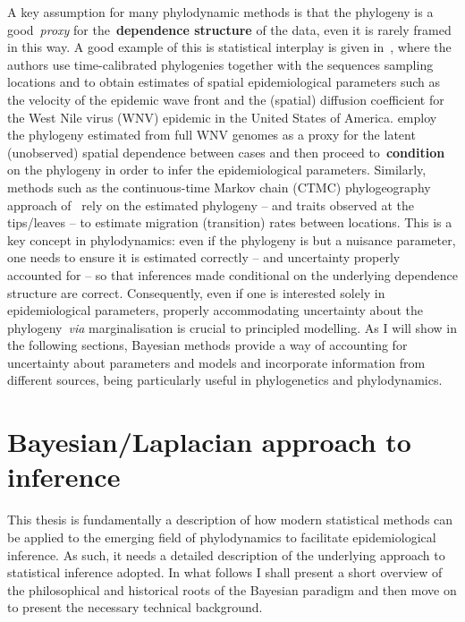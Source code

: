 A key assumption for many phylodynamic methods is that the phylogeny is a good~\textit{proxy} for the~\textbf{dependence structure} of the data, even it is rarely framed in this way.
A good example of this is statistical interplay is given in~\cite{Pybus2012}, where the authors use time-calibrated phylogenies together with the sequences sampling locations and  to obtain estimates of spatial epidemiological parameters such as the velocity of the epidemic wave front and the (spatial) diffusion coefficient for the West Nile virus (WNV) epidemic in the United States of America.
\cite{Pybus2012} employ the phylogeny estimated from full WNV genomes as a proxy for the latent (unobserved) spatial dependence between cases and then proceed to~\textbf{condition} on the phylogeny in order to infer the epidemiological parameters.
Similarly, methods such as the continuous-time Markov chain (CTMC) phylogeography approach of~\cite{Lemey2009} rely on the estimated phylogeny -- and traits observed at the tips/leaves -- to estimate migration (transition) rates between locations.
This is a key concept in phylodynamics: even if the phylogeny is but a nuisance parameter, one needs to ensure it is estimated correctly -- and uncertainty properly accounted for -- so that inferences made conditional on the underlying dependence structure are correct.
Consequently, even if one is interested solely in epidemiological parameters, properly accommodating uncertainty about the phylogeny~\textit{via} marginalisation is crucial to principled modelling.
As I will show in the following sections, Bayesian methods provide a way of accounting for uncertainty about parameters and models and incorporate information from different sources, being particularly useful in phylogenetics and phylodynamics.

\section{Bayesian/Laplacian approach to inference}
\label{sec:bayesian_inference}

This thesis is fundamentally a description of how modern statistical methods can be applied to the emerging field of phylodynamics to facilitate epidemiological inference.
As such, it needs a detailed description of the underlying approach to statistical inference adopted.
In what follows I shall present a short overview of the philosophical and historical roots of the Bayesian paradigm and then move on to present the necessary technical background.

